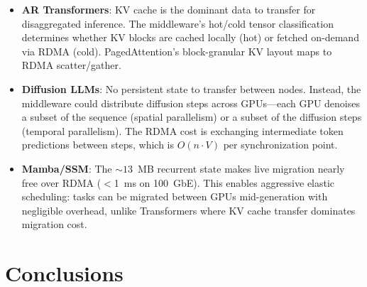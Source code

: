 \documentclass[11pt,letterpaper]{article}
\begin{document}
\begin{itemize}[noitemsep]
    \item \textbf{AR Transformers}: KV cache is the dominant data to transfer for disaggregated inference. The middleware's hot/cold tensor classification determines whether KV blocks are cached locally (hot) or fetched on-demand via RDMA (cold). PagedAttention's block-granular KV layout maps to RDMA scatter/gather.

    \item \textbf{Diffusion LLMs}: No persistent state to transfer between nodes. Instead, the middleware could distribute diffusion steps across GPUs---each GPU denoises a subset of the sequence (spatial parallelism) or a subset of the diffusion steps (temporal parallelism). The RDMA cost is exchanging intermediate token predictions between steps, which is $O(n \cdot V)$ per synchronization point.

    \item \textbf{Mamba/SSM}: The ${\sim}13$~MB recurrent state makes live migration nearly free over RDMA ($<$1~ms on 100~GbE). This enables aggressive elastic scheduling: tasks can be migrated between GPUs mid-generation with negligible overhead, unlike Transformers where KV cache transfer dominates migration cost.
\end{itemize}

\section{Conclusions}
\end{document}
